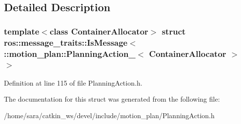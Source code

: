 \subsection{Detailed Description}
\subsubsection*{template$<$class Container\+Allocator$>$\newline
struct ros\+::message\+\_\+traits\+::\+Is\+Message$<$ \+::motion\+\_\+plan\+::\+Planning\+Action\+\_\+$<$ Container\+Allocator $>$ $>$}



Definition at line 115 of file Planning\+Action.\+h.



The documentation for this struct was generated from the following file\+:\begin{DoxyCompactItemize}
\item 
/home/sara/catkin\+\_\+ws/devel/include/motion\+\_\+plan/Planning\+Action.\+h\end{DoxyCompactItemize}
